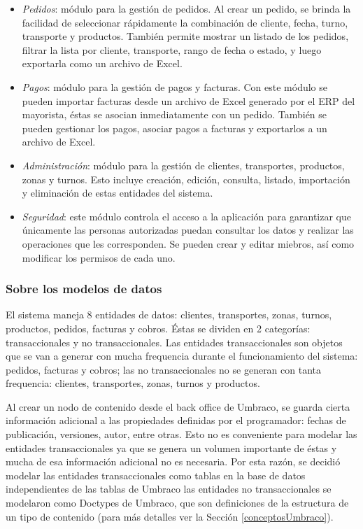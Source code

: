 \begin{itemize}
    \item \emph{Pedidos}: módulo para la gestión de pedidos. Al crear un pedido, se brinda la facilidad de seleccionar rápidamente la combinación de cliente, fecha, turno, transporte y productos. También permite mostrar un listado de los pedidos, filtrar la lista por cliente, transporte, rango de fecha o estado, y luego exportarla como un archivo de Excel. 
    \item \emph{Pagos}: módulo para la gestión de pagos y facturas. Con este módulo se pueden importar facturas desde un archivo de Excel generado por el \ac{ERP} del mayorista, éstas se asocian inmediatamente con un pedido. También se pueden gestionar los pagos, asociar pagos a facturas y exportarlos a un archivo de Excel.
    \item \emph{Administración}: módulo para la gestión de clientes, transportes, productos, zonas y turnos. Esto incluye creación, edición, consulta, listado, importación y eliminación de estas entidades del sistema.
    \item \emph{Seguridad}: este módulo controla el acceso a la aplicación para garantizar que únicamente las personas autorizadas puedan consultar los datos y realizar las operaciones que les corresponden. Se pueden crear y editar miebros, así como modificar los permisos de cada uno.
\end{itemize}

\subsubsection{Sobre los modelos de datos} \label{modeloDeDatos}
El sistema maneja 8 entidades de datos: clientes, transportes, zonas, turnos, productos, pedidos, facturas y cobros. Éstas se dividen en 2 categorías: transaccionales y no transaccionales. Las entidades transaccionales son objetos que se van a generar con mucha frequencia durante el funcionamiento del sistema: pedidos, facturas y cobros; las no transaccionales no se generan con tanta frequencia: clientes, transportes, zonas, turnos y productos.

Al crear un nodo de contenido desde el back office de Umbraco, se guarda cierta información adicional a las propiedades definidas por el programador: fechas de publicación, versiones, autor, entre otras. Esto no es conveniente para modelar las entidades transaccionales ya que se genera un volumen importante de éstas y mucha de esa información adicional no es necesaria. Por esta razón, se decidió modelar las entidades transaccionales como tablas en la base de datos independientes de las tablas de Umbraco las entidades no transaccionales se modelaron como Doctypes de Umbraco, que son definiciones de la estructura de un tipo de contenido (para más detalles ver la Sección \ref{conceptosUmbraco}).

